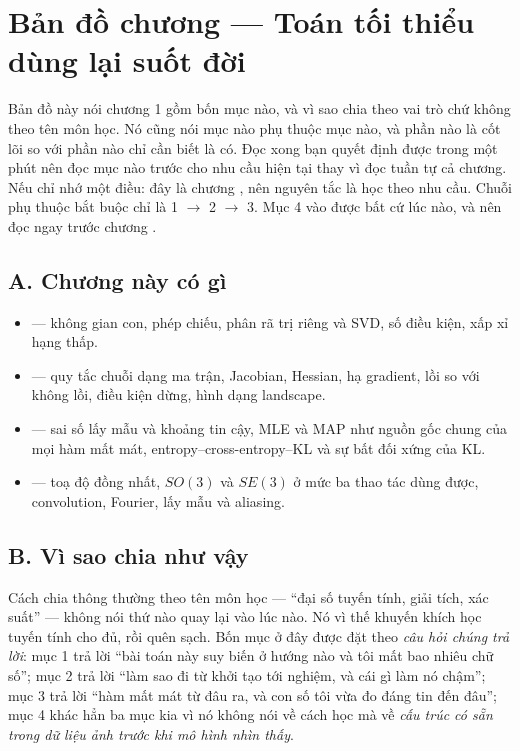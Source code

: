 \documentclass[../../deep_learning.tex]{subfiles}
\begin{document}
\section*{Bản đồ chương --- Toán tối thiểu dùng lại suốt đời}

\begin{tomtat}
Bản đồ này nói chương 1 gồm bốn mục nào, và vì sao chia theo vai trò chứ không theo tên môn học. Nó cũng nói mục nào phụ thuộc mục nào, và phần nào là cốt lõi so với phần nào chỉ cần biết là có. Đọc xong bạn quyết định được trong một phút nên đọc mục nào trước cho nhu cầu hiện tại thay vì đọc tuần tự cả chương. Nếu chỉ nhớ một điều: đây là chương , nên nguyên tắc là học theo nhu cầu. Chuỗi phụ thuộc bắt buộc chỉ là 1 \(\rightarrow\) 2 \(\rightarrow\) 3. Mục 4 vào được bất cứ lúc nào, và nên đọc ngay trước chương .
\end{tomtat}

\subsection*{A. Chương này có gì}

\begin{itemize}
\item \textbf{} --- không gian con, phép chiếu, phân rã trị riêng và SVD, số điều kiện, xấp xỉ hạng thấp.
\item \textbf{} --- quy tắc chuỗi dạng ma trận, Jacobian, Hessian, hạ gradient, lồi so với không lồi, điều kiện dừng, hình dạng landscape.
\item \textbf{} --- sai số lấy mẫu và khoảng tin cậy, MLE và MAP như nguồn gốc chung của mọi hàm mất mát, entropy--cross-entropy--KL và sự bất đối xứng của KL.
\item \textbf{} --- toạ độ đồng nhất, \(SO(3)\) và \(SE(3)\) ở mức ba thao tác dùng được, convolution, Fourier, lấy mẫu và aliasing.
\end{itemize}

\subsection*{B. Vì sao chia như vậy}
Cách chia thông thường theo tên môn học --- ``đại số tuyến tính, giải tích, xác suất'' --- không nói thứ nào quay lại vào lúc nào. Nó vì thế khuyến khích học tuyến tính cho đủ, rồi quên sạch. Bốn mục ở đây được đặt theo \emph{câu hỏi chúng trả lời}: mục 1 trả lời ``bài toán này suy biến ở hướng nào và tôi mất bao nhiêu chữ số''; mục 2 trả lời ``làm sao đi từ khởi tạo tới nghiệm, và cái gì làm nó chậm''; mục 3 trả lời ``hàm mất mát từ đâu ra, và con số tôi vừa đo đáng tin đến đâu''; mục 4 khác hẳn ba mục kia vì nó không nói về cách học mà về \emph{cấu trúc có sẵn trong dữ liệu ảnh trước khi mô hình nhìn thấy}.
\end{document}
